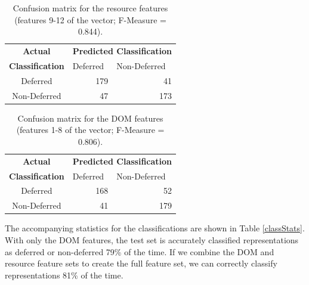 \documentclass{ipres_proc_article-sp}
\begin{document}
\begin{table}
\centering\begin{tabular}{cll}
\textbf{Actual} & \multicolumn{2}{c}{ \textbf{Predicted Classification}}                           \\
\textbf{Classification}   &          Deferred       &           Non-Deferred             \\ \cline{2-3} 
       Deferred           & \multicolumn{1}{|r}{179} & \multicolumn{1}{|r|}{41} \\ \cline{2-3} 
       Non-Deferred       & \multicolumn{1}{|r}{47} & \multicolumn{1}{|r|}{173} \\ \cline{2-3} 
\end{tabular}
 \caption{Confusion matrix for the resource features (features 9-12 of the vector; F-Measure = 0.844).}
  \label{cmResource}
\end{table}

\begin{table}
\centering\begin{tabular}{cll}
\textbf{Actual} & \multicolumn{2}{c}{ \textbf{Predicted Classification}}                           \\
\textbf{Classification}   &          Deferred       &           Non-Deferred             \\ \cline{2-3} 
       Deferred           & \multicolumn{1}{|r}{168} & \multicolumn{1}{|r|}{52} \\ \cline{2-3} 
       Non-Deferred       & \multicolumn{1}{|r}{41} & \multicolumn{1}{|r|}{179} \\ \cline{2-3} 
\end{tabular}
 \caption{Confusion matrix for the DOM features (features 1-8 of the vector; F-Measure = 0.806).}
  \label{cmDOM}
\end{table}

The accompanying statistics for the classifications are shown in Table \ref{classStats}. With only the DOM features, the test set is accurately classified representations as deferred or non-deferred 79\% of the time. If we combine the DOM and resource feature sets to create the full feature set, we can correctly classify representations 81\% of the time. %
\end{document}
